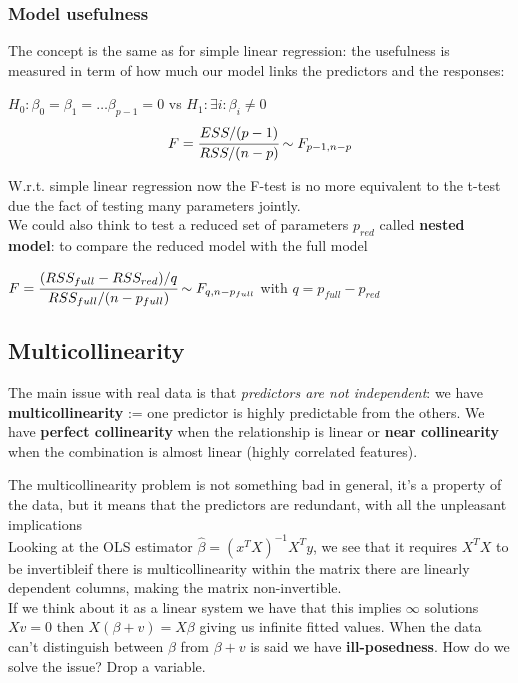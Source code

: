 \subsubsection{Model usefulness}
The concept is the same as for simple linear regression: the usefulness is measured in term of how
much our model links the predictors and the responses:
\begin{center}
    $H_0:\beta_0=\beta_1=\dots\beta_{p-1}=0$ vs $H_1: \exists i:\beta_i\ne 0$ \\
    $$
        F= \cfrac{ESS/(p-1)}{RSS/(n-p)} \sim F_{p-1,n-p}
    $$
\end{center}
W.r.t. simple linear regression now the F-test is no more equivalent to the t-test due 
the fact of testing many parameters jointly.\\
\vspace{0.2cm}
We could also think to test a reduced set of parameters $p_{red}$ called \textbf{nested 
model}: to compare the reduced model with the full model
\begin{center}
    $F= \cfrac{(RSS_{full}-RSS_{red})/q}{RSS_{full}/(n-p_{full})} \sim F_{q,n-p_{full}}$ with 
    $q=p_{full}-p_{red}$
\end{center}

\subsection{Multicollinearity}
The main issue with real data is that \textit{predictors are not independent}: we have 
\textbf{multicollinearity} := one predictor is highly predictable from the others.
We have \textbf{perfect collinearity} when the relationship is linear or \textbf{near 
collinearity} when the combination is almost linear (highly correlated features).

\vspace{0.2cm}
The multicollinearity problem is not something bad in general, it's a property of the data, but it means that the predictors are redundant, with all the unpleasant implications\\

\vspace{0.2cm}
Looking at the OLS estimator $\hat{\beta}=(x^TX)^{-1}X^Ty$, we see that it requires $X^TX$ to be invertible\arrow if there is multicollinearity within the matrix there are linearly dependent columns, making the matrix non-invertible.\\
If we think about it as a linear system we have that this implies $\infty$ solutions\arrow $Xv=0$ then $X(\beta+v)=X\beta$ giving us infinite fitted values.
When the data can't distinguish between $\beta$ from $\beta+v$ is said we have 
\textbf{ill-posedness}. How do we solve the issue? Drop a variable.

